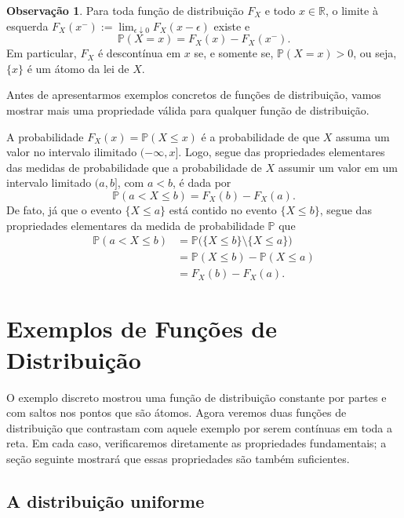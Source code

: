\documentclass[12pt,portuguese]{article}
\theoremstyle{definition}
\newtheorem{remark}[remark]{Observação}
\theoremstyle{plainexercise}
\theoremstyle{starredexercise}
\theoremstyle{definition}
\begin{document}
\begin{remark}\label{rem:atomo-limite-esquerda}
Para toda função de distribuição $F_X$ e todo $x\in\mathbb{R}$, o limite à
esquerda $F_X(x^-):=\lim_{\epsilon\downarrow 0}F_X(x-\epsilon)$ existe e
\[
  \mathbb{P}(X=x)=F_X(x)-F_X(x^-).
\]
Em particular, $F_X$ é descontínua em $x$ se, e somente se,
$\mathbb{P}(X=x)>0$, ou seja, $\{x\}$ é um átomo da lei de $X$.
\end{remark}

Antes de apresentarmos exemplos concretos de funções de distribuição, vamos mostrar
mais uma propriedade válida para qualquer função de distribuição.

A probabilidade $F_X(x)=\mathbb{P}(X\leqslant x)$ é a
probabilidade de que $X$ assuma um valor no intervalo ilimitado
$(-\infty,x]$. Logo, segue das propriedades elementares das medidas
de probabilidade que a probabilidade de $X$ assumir um valor
em um intervalo limitado $(a,b]$, com $a<b$, é dada por
\begin{equation}
\label{eq:intervalo-fd}
  \mathbb{P}(a<X\leqslant b)=F_X(b)-F_X(a).
\end{equation}
%
De fato, já que o evento $\{X\leqslant a\}$ está contido no evento $\{X\leqslant b\}$, 
segue das propriedades elementares da medida de probabilidade $\mathbb{P}$ que
\begin{align*}
\mathbb{P}(a<X\leqslant b)
&= 
\mathbb{P}\big(\{X\leqslant b\}\setminus\{X\leqslant a\}\big)
\\[0.2cm]
&= 
\mathbb{P}(X\leqslant b)-\mathbb{P}(X\leqslant a)
\\[0.2cm]
&= F_{X}(b)-F_{X}(a).
\end{align*}


\section{Exemplos de Funções de Distribuição}\label{sec:exemplos-fd}

O exemplo discreto mostrou uma função de distribuição constante por partes e
com saltos nos pontos que são átomos. Agora veremos duas funções de distribuição
que contrastam com aquele exemplo por serem contínuas em toda a reta. Em cada
caso, verificaremos diretamente as propriedades fundamentais; a seção seguinte
mostrará que essas propriedades são também suficientes.

\subsection{A distribuição uniforme}
\end{document}
